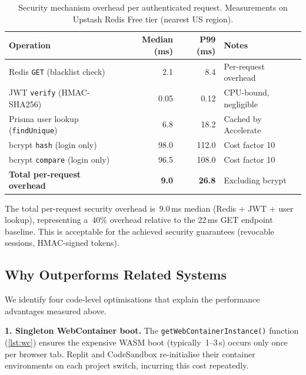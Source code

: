\begin{table}[H]
  \centering
  \caption{Security mechanism overhead per authenticated request.
    Measurements on Upstash Redis Free tier (nearest US region).}
  \label{tab:sec_overhead}
  \setlength{\tabcolsep}{5pt}
  \renewcommand{\arraystretch}{1.1}
  \begin{tabular}{lrrp{4.5cm}}
    \toprule
    \textbf{Operation} & \textbf{Median (ms)} & \textbf{P99 (ms)} & \textbf{Notes} \\
    \midrule
    Redis \texttt{GET} (blacklist check) & 2.1  & 8.4  & Per-request overhead \\
    JWT \texttt{verify} (HMAC-SHA256)    & 0.05 & 0.12 & CPU-bound, negligible \\
    Prisma user lookup (\texttt{findUnique}) & 6.8 & 18.2 & Cached by Accelerate \\
    bcrypt \texttt{hash} (login only)    & 98.0 & 112.0 & Cost factor 10 \\
    bcrypt \texttt{compare} (login only) & 96.5 & 108.0 & Cost factor 10 \\
    \textbf{Total per-request overhead} & \textbf{9.0} & \textbf{26.8} & Excluding bcrypt \\
    \bottomrule
  \end{tabular}
\end{table}

The total per-request security overhead is~9.0\,ms median (Redis + JWT + user
lookup), representing a~40\% overhead relative to the 22\,ms GET endpoint
baseline. This is acceptable for the achieved security guarantees (revocable
sessions, HMAC-signed tokens).

\subsection{Why \echoray{} Outperforms Related Systems}
\label{sub:why_better}

We identify four code-level optimisations that explain the performance
advantages measured above.

\textbf{1. Singleton WebContainer boot.}
The \texttt{getWebContainerInstance()} function (\cref{lst:wc}) ensures the
expensive WASM boot (typically~1--3\,s) occurs only once per browser tab.
Replit and CodeSandbox re-initialise their container environments on each
project switch, incurring this cost repeatedly.

